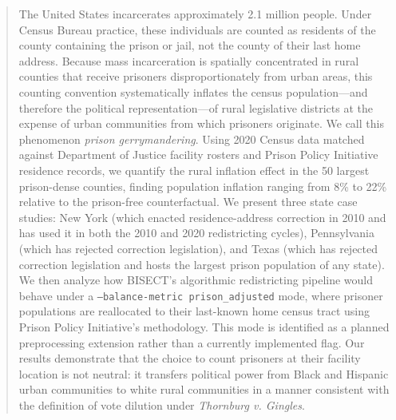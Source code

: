 \begin{abstract}
The United States incarcerates approximately 2.1 million people. Under Census Bureau practice, these individuals are counted as residents of the county containing the prison or jail, not the county of their last home address. Because mass incarceration is spatially concentrated in rural counties that receive prisoners disproportionately from urban areas, this counting convention systematically inflates the census population---and therefore the political representation---of rural legislative districts at the expense of urban communities from which prisoners originate. We call this phenomenon \emph{prison gerrymandering}. Using 2020 Census data matched against Department of Justice facility rosters and Prison Policy Initiative residence records, we quantify the rural inflation effect in the 50 largest prison-dense counties, finding population inflation ranging from 8\% to 22\% relative to the prison-free counterfactual. We present three state case studies: New York (which enacted residence-address correction in 2010 and has used it in both the 2010 and 2020 redistricting cycles), Pennsylvania (which has rejected correction legislation), and Texas (which has rejected correction legislation and hosts the largest prison population of any state). We then analyze how BISECT's algorithmic redistricting pipeline would behave under a \texttt{--balance-metric prison\_adjusted} mode, where prisoner populations are reallocated to their last-known home census tract using Prison Policy Initiative's methodology. This mode is identified as a planned preprocessing extension rather than a currently implemented flag. Our results demonstrate that the choice to count prisoners at their facility location is not neutral: it transfers political power from Black and Hispanic urban communities to white rural communities in a manner consistent with the definition of vote dilution under \emph{Thornburg v. Gingles}.
\end{abstract}
